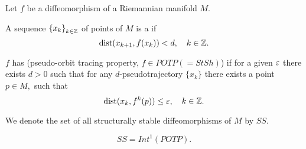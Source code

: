 Let $f$ be a diffeomorphism of a Riemannian manifold $M.$
%
\begin{deffnon}
A sequence $\left\{ {x}_{k} \right\}_{k\in\mathbb Z}$ of points of $M$ is a  if
\begin{equation*}
\operatorname{dist}(x_{k+1},f(x_k))<d,\quad k\in\mathbb Z.
\end{equation*}
\end{deffnon}
%
\devskip
%
\begin{deffnon}
$f$ has  (pseudo-orbit tracing property, $f\in POTP (=StSh)$) if for a given $\varepsilon$ there exists $d > 0$ such that for any $d$-pseudotrajectory $\{x_k\}$ there exists a point $p\in M,$ such that
$$
\operatorname{dist}(x_{k},f^k(p)) \leq  \varepsilon,\quad k\in\mathbb Z.
$$
\end{deffnon}
%
We denote the set of all structurally stable diffeomorphisms of $M$ by $SS.$
\begin{theoremnon}[Sakai, 1994]
$$SS=Int^1 (POTP).$$
\end{theoremnon} 
%
\devskip